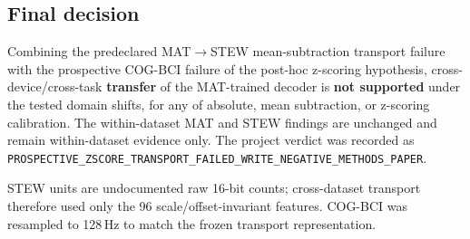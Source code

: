 \documentclass[11pt]{article}
\begin{document}
\subsection{Final decision}

Combining the predeclared MAT$\rightarrow$STEW mean-subtraction transport failure
with the prospective COG-BCI failure of the post-hoc z-scoring hypothesis,
cross-device/cross-task \textbf{transfer} of the MAT-trained decoder is
\textbf{not supported} under the tested domain shifts, for any of absolute, mean
subtraction, or z-scoring calibration. The within-dataset MAT and STEW findings
are unchanged and remain within-dataset evidence only. The project verdict was
recorded as \texttt{PROSPECTIVE\_ZSCORE\_TRANSPORT\_FAILED\_WRITE\_NEGATIVE\_METHODS\_PAPER}.

\begin{table}[ht]
\centering
\caption{Datasets and their fixed roles in the sequential design.}
\label{tab:datasets}
\small
{}
\par\vspace{2pt}
\footnotesize STEW units are undocumented raw 16-bit counts; cross-dataset
transport therefore used only the 96 scale/offset-invariant features. COG-BCI
was resampled to 128\,Hz to match the frozen transport representation.
\end{table}
\end{document}
